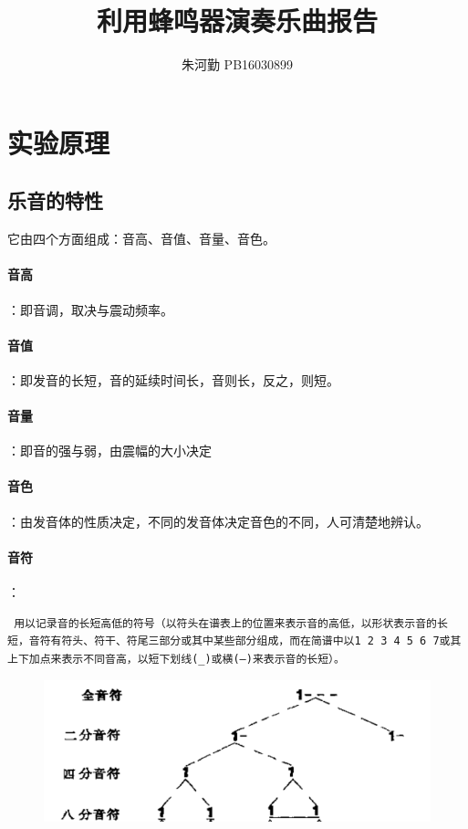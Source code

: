 \documentclass[UTF8]{ctexart}
\title{利用蜂鸣器演奏乐曲报告}
\author{朱河勤   PB16030899}
\begin{document}
\maketitle
\tableofcontents

\section{实验原理}
\subsection{乐音的特性}
它由四个方面组成：音高、音值、音量、音色。

\paragraph{  音高}：即音调，取决与震动频率。
\paragraph{  音值}：即发音的长短，音的延续时间长，音则长，反之，则短。
  \paragraph{  音量}：即音的强与弱，由震幅的大小决定
\paragraph{  音色}：由发音体的性质决定，不同的发音体决定音色的不同，人可清楚地辨认。
 \paragraph{  音符}：
 \begin{verbatim}
 用以记录音的长短高低的符号（以符头在谱表上的位置来表示音的高低，以形状表示音的长短，音符有符头、符干、符尾三部分或其中某些部分组成，而在简谱中以1 2 3 4 5 6 7或其上下加点来表示不同音高，以短下划线(_)或横(—)来表示音的长短）。
 \end{verbatim}
 \begin{figure}[H]
  \centering
  \includegraphics[width=1\textwidth]{yinfu.png}
\end{figure}
\end{document}
